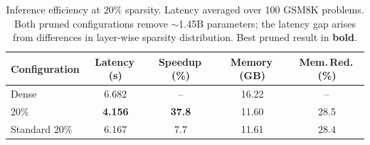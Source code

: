 \begin{table}[t]
\centering
\small
\caption{Inference efficiency at 20\% sparsity. Latency averaged over 100 GSM8K problems. Both pruned configurations remove ${\sim}$1.45B parameters; the latency gap arises from differences in layer-wise sparsity distribution. Best pruned result in \textbf{bold}.}
\label{tab:inference}
\begin{tabular}{@{}lcccc@{}}
\toprule
Configuration & Latency\,(s) & Speedup\,(\%) & Memory\,(GB) & Mem.\,Red.\,(\%) \\
\midrule
Dense & 6.682 & -- & 16.22 & -- \\
\rasp{} 20\% & \textbf{4.156} & \textbf{37.8} & 11.60 & 28.5 \\
Standard 20\% & 6.167 & 7.7 & 11.61 & 28.4 \\
\bottomrule
\end{tabular}
\end{table}
